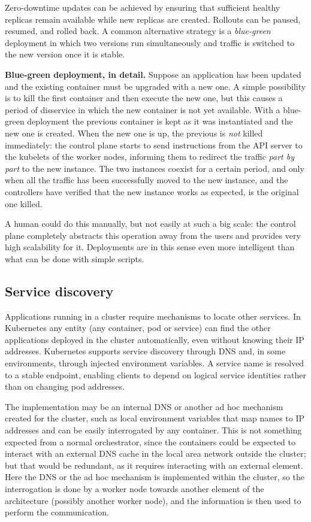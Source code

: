 Zero-downtime updates can be achieved by ensuring that sufficient healthy replicas remain available while new replicas are created. Rollouts can be paused, resumed, and rolled back. A common alternative strategy is a \emph{blue-green} deployment in which two versions run simultaneously and traffic is switched to the new version once it is stable.

\begin{notebox}
	\textbf{Blue-green deployment, in detail.} Suppose an application has been updated and the existing container must be upgraded with a new one. A simple possibility is to kill the first container and then execute the new one, but this causes a period of disservice in which the new container is not yet available. With a blue-green deployment the previous container is kept as it was instantiated and the new one is created. When the new one is up, the previous is \emph{not} killed immediately: the control plane starts to send instructions from the API server to the kubelets of the worker nodes, informing them to redirect the traffic \emph{part by part} to the new instance. The two instances coexist for a certain period, and only when all the traffic has been successfully moved to the new instance, and the controllers have verified that the new instance works as expected, is the original one killed.

	\medskip
	A human could do this manually, but not easily at such a big scale: the control plane completely abstracts this operation away from the users and provides very high scalability for it. Deployments are in this sense even more intelligent than what can be done with simple scripts.
\end{notebox}

\subsection{Service discovery}

Applications running in a cluster require mechanisms to locate other services. In Kubernetes any entity (any container, pod or service) can find the other applications deployed in the cluster automatically, even without knowing their IP addresses. Kubernetes supports service discovery through DNS and, in some environments, through injected environment variables. A service name is resolved to a stable endpoint, enabling clients to depend on logical service identities rather than on changing pod addresses.

The implementation may be an internal DNS or another ad hoc mechanism created for the cluster, such as local environment variables that map names to IP addresses and can be easily interrogated by any container. This is not something expected from a normal orchestrator, since the containers could be expected to interact with an external DNS cache in the local area network outside the cluster; but that would be redundant, as it requires interacting with an external element. Here the DNS or the ad hoc mechanism is implemented within the cluster, so the interrogation is done by a worker node towards another element of the architecture (possibly another worker node), and the information is then used to perform the communication.

